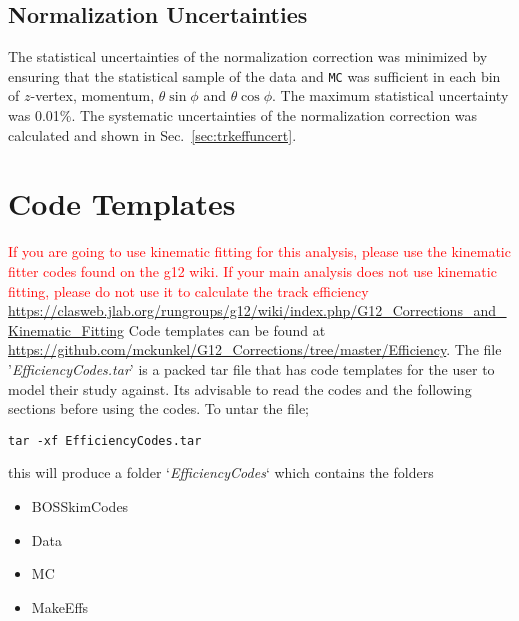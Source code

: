 \documentclass[11pt,a4paper]{article}
\newcommand{\abbr}[1]{\textsc{\texttt{#1}}}
\begin{document}
\FloatBarrier

\subsection{Normalization Uncertainties}
The statistical uncertainties of the normalization correction was minimized by ensuring that the statistical sample of the data and \abbr{MC} was sufficient in each bin of $z$-vertex, momentum, $\theta \sin\phi$ and $\theta \cos\phi$. The maximum statistical uncertainty was 0.01\%. The systematic uncertainties of the normalization correction was calculated and shown in Sec.~\ref{sec:trkeffuncert}.

\section{Code Templates}
{\huge \textcolor{red}{If you are going to use kinematic fitting for this analysis, please use the kinematic fitter codes found on the g12 wiki. If your main analysis does not use kinematic fitting, please do not use it to calculate the track efficiency }\newline \newline}\url{https://clasweb.jlab.org/rungroups/g12/wiki/index.php/G12_Corrections_and_Kinematic_Fitting}\newline \newline
Code templates can be found at
 \url{https://github.com/mckunkel/G12_Corrections/tree/master/Efficiency}.
The file '\emph{EfficiencyCodes.tar}' is a packed tar file that has code templates for the user to model their study against. Its advisable to read the codes and the following sections before using the codes.
To untar the file;
\begin{lstlisting}
tar -xf EfficiencyCodes.tar
\end{lstlisting}
this will produce a folder \newline
`\emph{EfficiencyCodes}` \newline
which contains the folders
\begin{itemize}
	\item BOSSkimCodes
	\item Data
	\item MC
	\item MakeEffs
\end{itemize}
\end{document}
